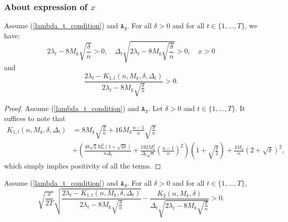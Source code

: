 \documentclass[twoside,11pt]{article}
\newcommand{\nb}{n}
\newcommand{\A}[1]{$\mathtt{A_#1}$}
\begin{document}
\subsubsection*{About expression of $x$}
\begin{lemma}
\label{HP_positivity}
Assume (\ref{lambda_t_condition}) and \A{3}. For all $\delta >0$ and for all $t \in \{1,\ldots,T\}$, we have:
$$  2 \lambda_t - 8 M_k \sqrt{\frac{\delta}{\nb}}> 0,\quad \Delta_t \sqrt{2 \lambda_t - 8 M_k \sqrt{\frac{\delta}{\nb}}} > 0,\quad x > 0$$
and
$$\frac{2\lambda_t - K_{1,t}\left(\nb,M_k,\delta,\Delta_t \right) }{2\lambda_t - 8 M_k \sqrt{\frac{\delta}{\nb}}}>0.$$
\end{lemma}
\begin{proof}
Assume (\ref{lambda_t_condition}) and \A{3}. Let $\delta>0$ and $t \in \{1,\ldots,T\}$. It suffices to note that 
    \begin{align*}
        K_{1,t}\left(\nb,M_k,\delta,\Delta_t \right)  &= 8 M_k \sqrt{\frac{\delta}{\nb}} + 16 M_k \frac{\nb-1}{\nb} \sqrt{\frac{\delta}{\nb}} \\
        &+ \left(\frac{48 \sqrt{2} M_k^2 \left(1 +\sqrt{2\delta} \right)}{\nb \Delta_t} +  \frac{192 M_k^2}{\Delta_t \sqrt{\nb}} \left(\frac{\nb-1}{\nb}\right)^2 \right) \left( 1+ \sqrt{\frac{\delta}{2}} \right)  + \frac{4 M_k}{\nb} \left(2 + \sqrt{\delta} \right)^2,
    \end{align*}
    which simply implies positivity of all the terms.
\end{proof}
\begin{lemma}
\label{condition_Hoeffding}
Assume (\ref{lambda_t_condition}) and \A{3}. For all $\delta >0$ and for all $t \in \{1,\ldots,T\}$,
\begin{equation*}
    \sqrt{\frac{x}{2T}} \sqrt{\frac{2\lambda_t - K_{1,t}\left(\nb,M_k,\delta,\Delta_t \right) }{2\lambda_t - 8 M_k \sqrt{\frac{\delta}{\nb}}}} - \frac{K_2 \left( \nb,M_k,\delta \right)}{\Delta_t \sqrt{2\lambda_t - 8 M_k \sqrt{\frac{\delta}{\nb}}}} > 0.
\end{equation*}
\end{lemma}
\end{document}
